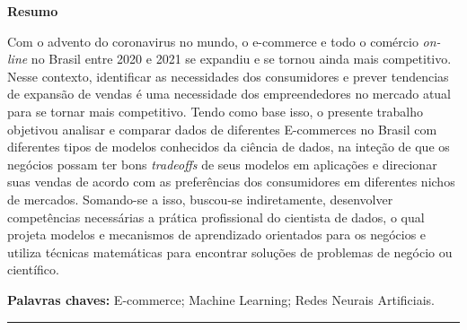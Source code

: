\documentclass[12pt,a4paper]{article}
\begin{document}
\begin{center}
    {\large \textbf{Resumo}}
\end{center}
Com o advento do coronavirus no mundo, o e-commerce e todo o comércio \textit{on-line} no Brasil entre 2020 e 2021 se expandiu e se tornou ainda mais competitivo. Nesse contexto, identificar as necessidades dos consumidores e prever tendencias de expansão de vendas é uma necessidade dos empreendedores no mercado atual para se tornar mais competitivo. Tendo como base isso, o presente trabalho objetivou analisar e comparar dados de diferentes E-commerces no Brasil com diferentes tipos de modelos conhecidos da ciência de dados, na inteção de que os negócios possam ter bons \textit{tradeoffs} de seus modelos em aplicações e direcionar suas vendas de acordo com as preferências dos consumidores em diferentes nichos de mercados. Somando-se a isso, buscou-se indiretamente, desenvolver competências necessárias a prática profissional do cientista de dados, o qual projeta modelos e mecanismos de aprendizado orientados para os negócios e utiliza técnicas matemáticas para encontrar soluções de problemas de negócio ou científico.

\begin{flushleft}
    {\large \textbf{Palavras chaves:}} E-commerce; Machine Learning; Redes Neurais Artificiais.
\end{flushleft}

\hrule
\hspace{0.5em}









\nocite{*}
\end{document}
